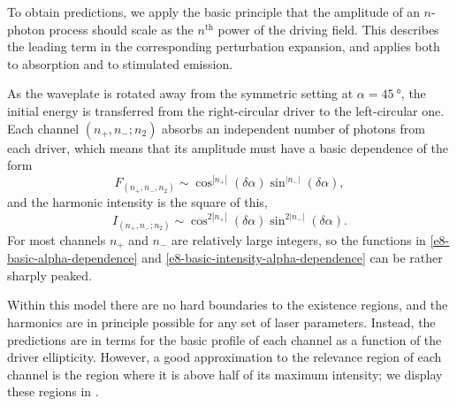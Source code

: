 To obtain predictions, we apply the basic principle that the amplitude of an $n$-photon process should scale as the $n^\text{th}$ power of the driving field. This describes the leading term in the corresponding perturbation expansion, and applies both to absorption and to stimulated emission.


As the waveplate is rotated away from the symmetric setting at $\alpha=\SI{45}{\degree}$, the initial energy is transferred from the right-circular driver to the left-circular one. Each channel $(n_+,n_-;n_2)$ absorbs an independent number of photons from each driver, which means that its amplitude must have a basic dependence of the form
\begin{equation}
 F_{(n_+,n_-,n_2)}\sim\cos^{|n_+|}(\delta\alpha)\sin^{|n_-|}(\delta\alpha),
 \label{e8-basic-alpha-dependence}
\end{equation}
and the harmonic intensity is the square of this,
\begin{equation}
 I_{(n_+,n_-;n_2)}\sim\cos^{2|n_+|}(\delta\alpha)\sin^{2|n_-|}(\delta\alpha).
 \label{e8-basic-intensity-alpha-dependence}
\end{equation}
For most channels $n_+$ and $n_-$ are relatively large integers, so the functions in \eqref{e8-basic-alpha-dependence} and \eqref{e8-basic-intensity-alpha-dependence} can be rather sharply peaked. 



Within this model there are no hard boundaries to the existence regions, and the harmonics are in principle possible for any set of laser parameters. Instead, the predictions are in terms for the basic profile of each channel as a function of the driver ellipticity. However, a good approximation to the relevance region of each channel is the region where it is above half of its maximum intensity; we display these regions in . 




